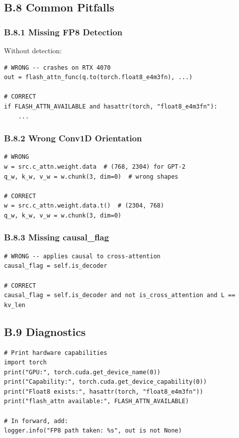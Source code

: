 \subsection{B.8 Common Pitfalls}

\subsubsection{B.8.1 Missing FP8 Detection}

Without detection:

\begin{lstlisting}
# WRONG -- crashes on RTX 4070
out = flash_attn_func(q.to(torch.float8_e4m3fn), ...)

# CORRECT
if FLASH_ATTN_AVAILABLE and hasattr(torch, "float8_e4m3fn"):
    ...
\end{lstlisting}

\subsubsection{B.8.2 Wrong Conv1D Orientation}

\begin{lstlisting}
# WRONG
w = src.c_attn.weight.data  # (768, 2304) for GPT-2
q_w, k_w, v_w = w.chunk(3, dim=0)  # wrong shapes

# CORRECT
w = src.c_attn.weight.data.t()  # (2304, 768)
q_w, k_w, v_w = w.chunk(3, dim=0)
\end{lstlisting}

\subsubsection{B.8.3 Missing causal\_flag}

\begin{lstlisting}
# WRONG -- applies causal to cross-attention
causal_flag = self.is_decoder

# CORRECT
causal_flag = self.is_decoder and not is_cross_attention and L == kv_len
\end{lstlisting}

\subsection{B.9 Diagnostics}

\begin{lstlisting}
# Print hardware capabilities
import torch
print("GPU:", torch.cuda.get_device_name(0))
print("Capability:", torch.cuda.get_device_capability(0))
print("Float8 exists:", hasattr(torch, "float8_e4m3fn"))
print("flash_attn available:", FLASH_ATTN_AVAILABLE)

# In forward, add:
logger.info("FP8 path taken: %s", out is not None)
\end{lstlisting}

